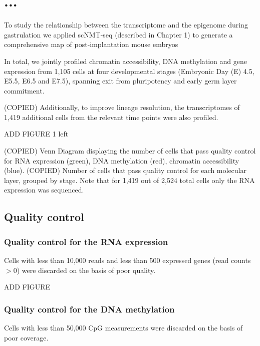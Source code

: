 
\section{...}


To study the relationship between the transcriptome and the epigenome during gastrulation we applied scNMT-seq (described in Chapter 1) to generate a comprehensive map of post-implantation mouse embryos

In total, we jointly profiled chromatin accessibility, DNA methylation and gene expression from 1,105  cells at four developmental stages (Embryonic Day (E) 4.5, E5.5, E6.5 and E7.5), spanning exit from pluripotency and early germ layer commitment.

(COPIED) Additionally, to improve lineage resolution, the transcriptomes of 1,419 additional cells from the relevant time points were also profiled.


ADD FIGURE 1 left

(COPIED) Venn Diagram displaying the number of cells that pass quality control for RNA expression (green), DNA methylation (red), chromatin accessibility (blue).
(COPIED) Number of cells that pass quality control for each molecular layer, grouped by stage. Note that for 1,419 out of 2,524 total cells only the RNA expression was sequenced.

\subsection{Quality control}
\subsubsection{Quality control for the RNA expression}

Cells with less than 10,000 reads and less than 500 expressed genes (read counts $>0$) were discarded on the basis of poor quality.

ADD FIGURE



\subsubsection{Quality control for the DNA methylation}

Cells with less than 50,000 CpG measurements were discarded on the basis of poor coverage.

